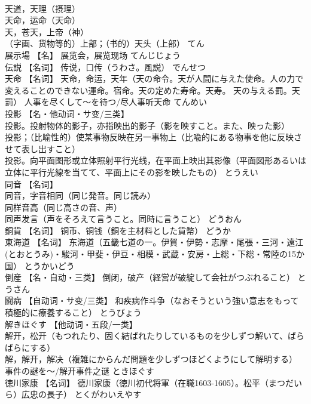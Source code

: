 \documentclass[8pt]{extreport}
\begin{document}
\begin{CJK}{UTF8}{min}
\\	天道，天理（摂理） 
\\	天命，运命（天命） 
\\	天，苍天，上帝（神） 
\\	（字画、货物等的）上部；（书的）天头（上部）	てん	
\\	展示場	【名】 展览会，展览现场	てんじじょう	
\\	伝説	【名词】 传说，口传（うわさ。風説）	でんせつ	
\\	天命	【名词】 天命，命运，天年（天の命令。天が人間に与えた使命。人の力で変えることのできない運命。宿命。天の定めた寿命。天寿。 天の与える罰。天罰） 人事を尽くして～を待つ/尽人事听天命	てんめい	
\\	投影	【名・他动词・サ变/三类】 
\\	投影。投射物体的影子，亦指映出的影子（影を映すこと。また、映った影） 
\\	投影；（比喻性的）使某事物反映在另一事物上（比喩的にある物事を他に反映させて表し出すこと） 
\\	[数]投影。向平面图形或立体照射平行光线，在平面上映出其影像（平面図形あるいは立体に平行光線を当てて、平面上にその影を映したもの）	とうえい	
\\	同音	【名词】 
\\	同音，字音相同（同じ発音。同じ読み） 
\\	同样音高（同じ高さの音、声） 
\\	同声发言（声をそろえて言うこと。同時に言うこと）	どうおん	
\\	銅貨	【名词】 铜币、铜钱（銅を主材料とした貨幣）	どうか	
\\	東海道	【名词】 东海道（五畿七道の一。伊賀・伊勢・志摩・尾張・三河・遠江(とおとうみ)・駿河・甲斐・伊豆・相模・武蔵・安房・上総・下総・常陸の15か国）	とうかいどう	
\\	倒産	【名・自动・三类】 倒闭，破产（経営が破綻して会社がつぶれること）	とうさん	
\\	闘病	【自动词・サ变/三类】 和疾病作斗争（なおそうという強い意志をもって積極的に療養すること）	とうびょう	
\\	解きほぐす	【他动词・五段/一类】 
\\	解开，松开（もつれたり、固く結ばれたりしているものを少しずつ解いて、ばらばらにする） 
\\	解，解开，解决（複雑にからんだ問題を少しずつほどくようにして解明する） 事件の謎を～/解开事件之谜	ときほぐす	
\\	徳川家康	【名词】 德川家康（徳川初代将軍（在職1603-1605）。松平（まつだいら）広忠の長子）	とくがわいえやす	

\end{CJK}
\end{document}

